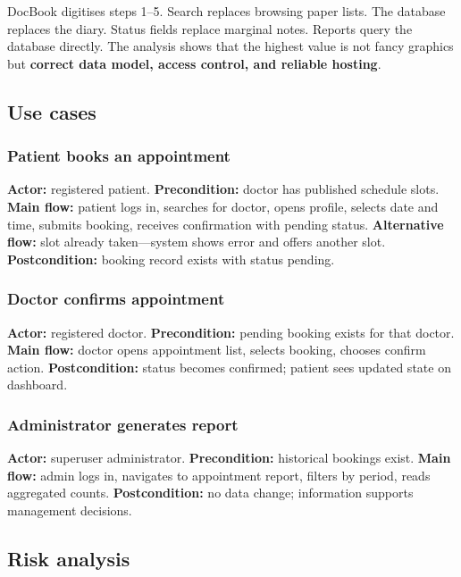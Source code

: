 DocBook digitises steps 1--5. Search replaces browsing paper lists. The database replaces the diary. Status fields replace marginal notes. Reports query the database directly. The analysis shows that the highest value is not fancy graphics but \textbf{correct data model, access control, and reliable hosting}.

\subsection{Use cases}

\subsubsection{Patient books an appointment}

\textbf{Actor:} registered patient. \textbf{Precondition:} doctor has published schedule slots. \textbf{Main flow:} patient logs in, searches for doctor, opens profile, selects date and time, submits booking, receives confirmation with pending status. \textbf{Alternative flow:} slot already taken---system shows error and offers another slot. \textbf{Postcondition:} booking record exists with status pending.

\subsubsection{Doctor confirms appointment}

\textbf{Actor:} registered doctor. \textbf{Precondition:} pending booking exists for that doctor. \textbf{Main flow:} doctor opens appointment list, selects booking, chooses confirm action. \textbf{Postcondition:} status becomes confirmed; patient sees updated state on dashboard.

\subsubsection{Administrator generates report}

\textbf{Actor:} superuser administrator. \textbf{Precondition:} historical bookings exist. \textbf{Main flow:} admin logs in, navigates to appointment report, filters by period, reads aggregated counts. \textbf{Postcondition:} no data change; information supports management decisions.

\subsection{Risk analysis}

